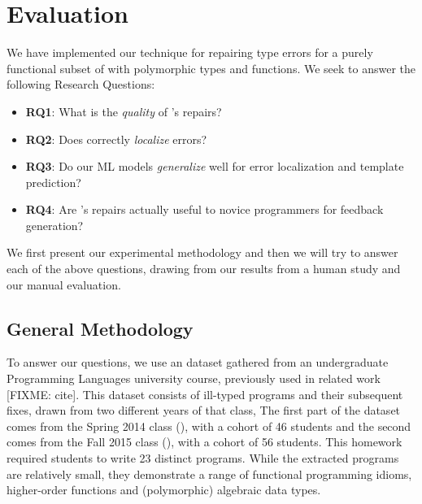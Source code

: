 \section{Evaluation}
\label{sec:eval}

\lstMakeShortInline[mathescape=true]{|}


We have implemented our technique for repairing type errors for a purely
functional subset of \ocaml with polymorphic types and functions. We seek to
answer the following Research Questions:

\begin{itemize}
    \item \textbf{RQ1}: What is the \emph{quality} of \toolname's repairs?
    \item \textbf{RQ2}: Does \toolname correctly \emph{localize} errors?
    \item \textbf{RQ3}: Do our ML models \emph{generalize} well for error
    localization and template prediction?
    \item \textbf{RQ4}: Are \toolname's repairs actually useful to novice programmers
    for feedback generation?
\end{itemize}

We first present our experimental methodology and then we will try to answer
each of the above questions, drawing from our results from a human study and our
manual evaluation.


\subsection{General Methodology}
\label{subsec:gen_method}
To answer our questions, we use an \ocaml dataset gathered from an
undergraduate Programming Languages university course, previously
used in related work [FIXME: cite]. This dataset consists of ill-typed programs
and their subsequent fixes, drawn from two different years of that class, The
first part of the dataset comes from the Spring 2014 class (\SPRING), with a
cohort of 46 students and the second comes from the Fall 2015 class (\FALL),
with a cohort of 56 students. This homework required students to write 23
distinct programs. While the extracted programs are relatively
small, they demonstrate a range of functional programming idioms, \eg
higher-order functions and (polymorphic) algebraic data types.

